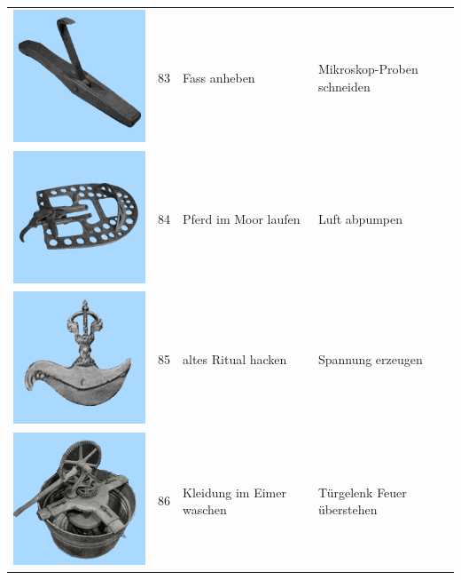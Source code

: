 \documentclass[
  english,
  man,floatsintext]{apa7}
\begin{document}
\begin{center}
\begin{ThreePartTable}
\begin{longtable}{llll}
\includegraphics[valign=c, scale=0.19]{../materials/unfamiliar/83.png} & 83 & Fass anheben & Mikroskop-Proben schneiden\\
\includegraphics[valign=c, scale=0.19]{../materials/unfamiliar/84.png} & 84 & Pferd im Moor laufen & Luft abpumpen\\
\includegraphics[valign=c, scale=0.19]{../materials/unfamiliar/85.png} & 85 & altes Ritual hacken & Spannung erzeugen\\
\includegraphics[valign=c, scale=0.19]{../materials/unfamiliar/86.png} & 86 & Kleidung im Eimer waschen & Türgelenk Feuer überstehen\\

\end{longtable}
\end{ThreePartTable}
\end{center}
\end{document}
